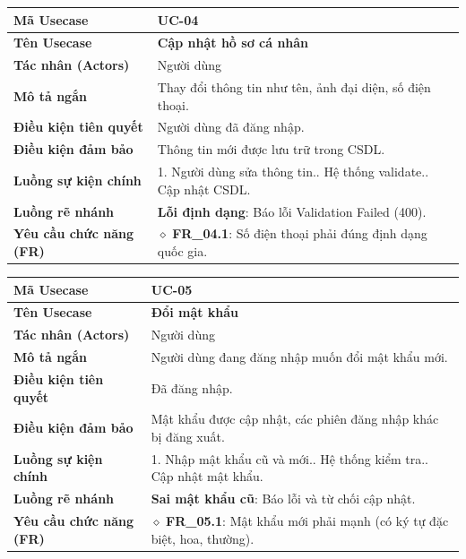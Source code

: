 \begin{table}[H]
\renewcommand{\arraystretch}{1.3}
\centering
\begin{tabularx}{\textwidth}{|p{4.5cm}|X|}
\hline
\cellcolor{gray!15}\bfseries Mã Usecase & \textbf{UC-04} \\ \hline
\cellcolor{gray!15}\bfseries Tên Usecase & \textbf{Cập nhật hồ sơ cá nhân} \\ \hline
\cellcolor{gray!15}\bfseries Tác nhân (Actors) & Người dùng \\ \hline
\cellcolor{gray!15}\bfseries Mô tả ngắn & Thay đổi thông tin như tên, ảnh đại diện, số điện thoại. \\ \hline
\cellcolor{gray!15}\bfseries Điều kiện tiên quyết & Người dùng đã đăng nhập. \\ \hline
\cellcolor{gray!15}\bfseries Điều kiện đảm bảo & Thông tin mới được lưu trữ trong CSDL. \\ \hline
\cellcolor{gray!15}\bfseries Luồng sự kiện chính & 1. Người dùng sửa thông tin.\newline 2. Hệ thống validate.\newline 3. Cập nhật CSDL. \\ \hline
\cellcolor{gray!15}\bfseries Luồng rẽ nhánh & \textbf{Lỗi định dạng}: Báo lỗi Validation Failed (400). \\ \hline
\cellcolor{gray!15}\bfseries Yêu cầu chức năng (FR) & $\diamond$ \textbf{FR\_04.1}: Số điện thoại phải đúng định dạng quốc gia. \\ \hline
\end{tabularx}
\end{table}

\begin{table}[H]
\renewcommand{\arraystretch}{1.3}
\centering
\begin{tabularx}{\textwidth}{|p{4.5cm}|X|}
\hline
\cellcolor{gray!15}\bfseries Mã Usecase & \textbf{UC-05} \\ \hline
\cellcolor{gray!15}\bfseries Tên Usecase & \textbf{Đổi mật khẩu} \\ \hline
\cellcolor{gray!15}\bfseries Tác nhân (Actors) & Người dùng \\ \hline
\cellcolor{gray!15}\bfseries Mô tả ngắn & Người dùng đang đăng nhập muốn đổi mật khẩu mới. \\ \hline
\cellcolor{gray!15}\bfseries Điều kiện tiên quyết & Đã đăng nhập. \\ \hline
\cellcolor{gray!15}\bfseries Điều kiện đảm bảo & Mật khẩu được cập nhật, các phiên đăng nhập khác bị đăng xuất. \\ \hline
\cellcolor{gray!15}\bfseries Luồng sự kiện chính & 1. Nhập mật khẩu cũ và mới.\newline 2. Hệ thống kiểm tra.\newline 3. Cập nhật mật khẩu. \\ \hline
\cellcolor{gray!15}\bfseries Luồng rẽ nhánh & \textbf{Sai mật khẩu cũ}: Báo lỗi và từ chối cập nhật. \\ \hline
\cellcolor{gray!15}\bfseries Yêu cầu chức năng (FR) & $\diamond$ \textbf{FR\_05.1}: Mật khẩu mới phải mạnh (có ký tự đặc biệt, hoa, thường). \\ \hline
\end{tabularx}
\end{table}

